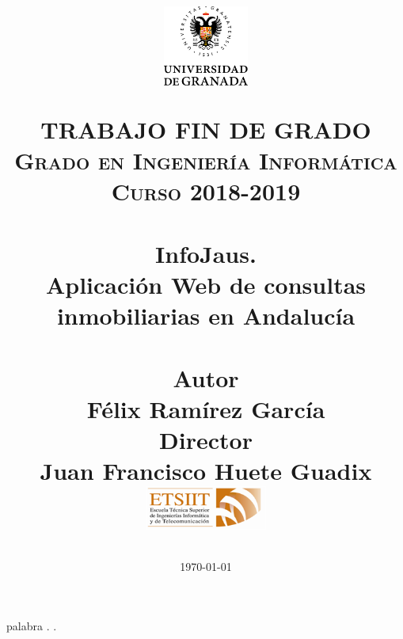 
\usepackage{url}

\title{	
	\normalfont \normalsize
	\begin{figure}[htb]
		\centering
		\includegraphics[width=0.25\textwidth]{./imagenes/1}
	\end{figure}
	\textsc{\textbf{TRABAJO FIN DE GRADO} \\ Grado en Ingeniería Informática \\ 
	Curso 2018-2019} \\ [25pt] 
	\horrule{0.5pt} \\[0.4cm]
	\huge InfoJaus. \\
	\huge Aplicación Web de consultas inmobiliarias en Andalucía
	\\ 
	\horrule{2pt} \\[0.5cm]
	\textbf{Autor}\\ {Félix Ramírez García}\\[1.0ex]
	\textbf{Director}\\ {Juan Francisco Huete Guadix}\\[0.5cm]
	\includegraphics[width=0.3\textwidth]{imagenes/etsiit_logo.png}\\[0.1cm]
	\date{\normalsize\today} 
}





	
	\maketitle %
	
	\thispagestyle{empty} 	%
	\textcolor[rgb]{1.00,1.00,1.00}{palabra} 
	\newpage %
	\thispagestyle{empty} 
	\textcolor[rgb]{1.00,1.00,1.00}{.}  
	\newpage %
	\thispagestyle{empty} 
	\textcolor[rgb]{1.00,1.00,1.00}{.} 
	\newpage %
	
